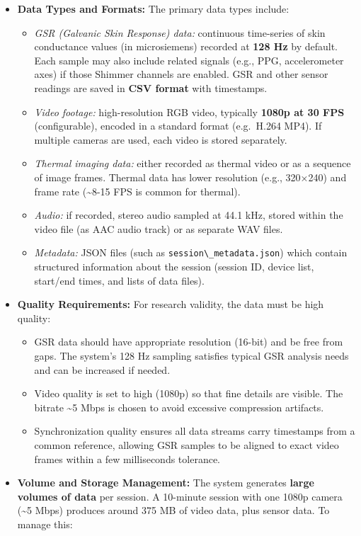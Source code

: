 \documentclass[12pt,a4paper]{article}
\begin{document}
\begin{itemize}
\item
  \textbf{Data Types and Formats:} The primary data types include:

  \begin{itemize}
  \tightlist
  \item
    \emph{GSR (Galvanic Skin Response) data:} continuous time-series of skin conductance values (in microsiemens) recorded at \textbf{128 Hz} by default. Each sample may also include related signals (e.g., PPG, accelerometer axes) if those Shimmer channels are enabled. GSR and other sensor readings are saved in \textbf{CSV format} with timestamps.
  \item
    \emph{Video footage:} high-resolution RGB video, typically \textbf{1080p at 30 FPS} (configurable), encoded in a standard format (e.g.~H.264 MP4). If multiple cameras are used, each video is stored separately.
  \item
    \emph{Thermal imaging data:} either recorded as thermal video or as a sequence of image frames. Thermal data has lower resolution (e.g., 320×240) and frame rate (\textasciitilde8-15 FPS is common for thermal).
  \item
    \emph{Audio:} if recorded, stereo audio sampled at 44.1 kHz, stored within the video file (as AAC audio track) or as separate WAV files.
  \item
    \emph{Metadata:} JSON files (such as \passthrough{\lstinline!session\_metadata.json!}) which contain structured information about the session (session ID, device list, start/end times, and lists of data files).
  \end{itemize}
\item
  \textbf{Quality Requirements:} For research validity, the data must be high quality:

  \begin{itemize}
  \tightlist
  \item
    GSR data should have appropriate resolution (16-bit) and be free from gaps. The system's 128 Hz sampling satisfies typical GSR analysis needs and can be increased if needed.
  \item
    Video quality is set to high (1080p) so that fine details are visible. The bitrate \textasciitilde5 Mbps is chosen to avoid excessive compression artifacts.
  \item
    Synchronization quality ensures all data streams carry timestamps from a common reference, allowing GSR samples to be aligned to exact video frames within a few milliseconds tolerance.
  \end{itemize}
\item
  \textbf{Volume and Storage Management:} The system generates \textbf{large volumes of data} per session. A 10-minute session with one 1080p camera (\textasciitilde5 Mbps) produces around 375 MB of video data, plus sensor data. To manage this:


\end{itemize}
\end{document}
